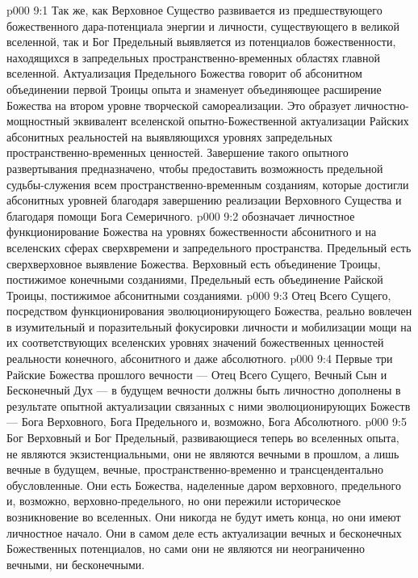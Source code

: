 \vs p000 9:1 Так же, как Верховное Существо развивается из предшествующего божественного дара\hyp{}потенциала энергии и личности, существующего в великой вселенной, так и Бог Предельный выявляется из потенциалов божественности, находящихся в запредельных пространственно\hyp{}временных областях главной вселенной. Актуализация Предельного Божества говорит об абсонитном объединении первой Троицы опыта и знаменует объединяющее расширение Божества на втором уровне творческой самореализации. Это образует личностно\hyp{}мощностный эквивалент вселенской опытно\hyp{}Божественной актуализации Райских абсонитных реальностей на выявляющихся уровнях запредельных пространственно\hyp{}временных ценностей. Завершение такого опытного развертывания предназначено, чтобы предоставить возможность предельной судьбы\hyp{}служения всем пространственно\hyp{}временным созданиям, которые достигли абсонитных уровней благодаря завершению реализации Верховного Существа и благодаря помощи Бога Семеричного.
\vs p000 9:2 \pc {} обозначает личностное функционирование Божества на уровнях божественности абсонитного и на вселенских сферах сверхвремени и запредельного пространства. Предельный есть сверхверховное выявление Божества. Верховный есть объединение Троицы, постижимое конечными созданиями, Предельный есть объединение Райской Троицы, постижимое абсонитными созданиями.
\vs p000 9:3 Отец Всего Сущего, посредством функционирования эволюционирующего Божества, реально вовлечен в изумительный и поразительный  фокусировки личности и мобилизации мощи на их соответствующих вселенских уровнях значений божественных ценностей реальности конечного, абсонитного и даже абсолютного.
\vs p000 9:4 Первые три Райские Божества прошлого вечности --- Отец Всего Сущего, Вечный Сын и Бесконечный Дух --- в будущем вечности должны быть личностно дополнены в результате опытной актуализации связанных с ними эволюционирующих Божеств --- Бога Верховного, Бога Предельного и, возможно, Бога Абсолютного.
\vs p000 9:5 \pc Бог Верховный и Бог Предельный, развивающиеся теперь во вселенных опыта, не являются экзистенциальными, они не являются вечными в прошлом, а лишь вечные в будущем, вечные, пространственно\hyp{}временно и трансцендентально обусловленные. Они есть Божества, наделенные даром верховного, предельного и, возможно, верховно\hyp{}предельного, но они пережили историческое возникновение во вселенных. Они никогда не будут иметь конца, но они имеют личностное начало. Они в самом деле есть актуализации вечных и бесконечных Божественных потенциалов, но сами они не являются ни неограниченно вечными, ни бесконечными.
